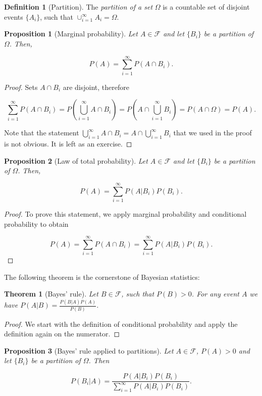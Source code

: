 \documentclass{book}
\theoremstyle{plain}%
\newtheorem{theorem}{Theorem}[section]
\newtheorem{proposition}{Proposition}[section]
\theoremstyle{definition}
\newtheorem{definition}{Definition}[section]
\begin{document}
\begin{definition}[Partition]
The \emph{partition of a set} $\Omega$ is a countable set of disjoint events $\{A_i\}$, such that $\cup_{i=1}^\infty A_i = \Omega$. 
\end{definition}

\begin{proposition}[Marginal probability] Let $A \in \mathcal{F}$ and let $\{B_i\}$ be a partition of $\Omega$. Then,

$$P(A) = \sum_{i=1}^\infty P(A \cap B_i).$$
\end{proposition}

\begin{proof}
Sets $A \cap B_i$ are disjoint, therefore 

$$\sum_{i=1}^\infty P(A \cap B_i) = P(\bigcup_{i=1}^\infty A \cap B_i) = P(A \cap \bigcup_{i=1}^\infty B_i) = P(A \cap \Omega) = P(A).$$

Note that the statement $\bigcup_{i=1}^\infty A \cap B_i = A \cap \bigcup_{i=1}^\infty B_i$ that we used in the proof is not obvious. It is left as an exercise.
\end{proof}

\begin{proposition}[Law of total probability] Let $A \in \mathcal{F}$ and let $\{B_i\}$ be a partition of $\Omega$. Then,

$$P(A) = \sum_{i=1}^\infty P(A|B_i)P(B_i).$$
\end{proposition}

\begin{proof}
To prove this statement, we apply marginal probability and conditional probability to obtain

$$P(A)  = \sum_{i=1}^\infty P(A \cap B_i) = \sum_{i=1}^\infty P(A|B_i)P(B_i).$$
\end{proof}

The following theorem is the cornerstone of Bayesian statistics:

\begin{theorem}[Bayes' rule] Let $B \in \mathcal{F}$, such that $P(B) > 0$. For any event $A$ we have
$P(A|B) = \frac{P(B|A)P(A)}{P(B)}$.
\end{theorem}

\begin{proof}
We start with the definition of conditional probability and apply the definition again on the numerator.
\end{proof}

\begin{proposition}[Bayes' rule applied to partitions] Let $A \in \mathcal{F}$, $P(A) > 0$ and let $\{B_i\}$ be a partition of $\Omega$. Then

$$P(B_i|A) = \frac{P(A|B_i)P(B_i)}{\sum_{i=1}^\infty P(A|B_i)P(B_i)}.$$
\end{proposition}
\end{document}
